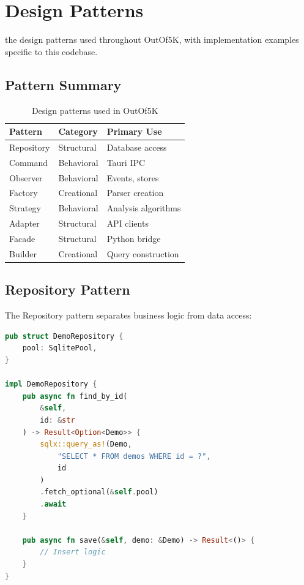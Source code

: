 \chapter{Design Patterns}
\label{ch:patterns}

 the design patterns used throughout OutOf5K, with implementation examples specific to this codebase.

\section{Pattern Summary}

\begin{table}[h]
    \centering
    \begin{tabular}{@{}lll@{}}
        \toprule
        \textbf{Pattern} & \textbf{Category} & \textbf{Primary Use} \\
        \midrule
        Repository & Structural & Database access \\
        Command & Behavioral & Tauri IPC \\
        Observer & Behavioral & Events, stores \\
        Factory & Creational & Parser creation \\
        Strategy & Behavioral & Analysis algorithms \\
        Adapter & Structural & API clients \\
        Facade & Structural & Python bridge \\
        Builder & Creational & Query construction \\
        \bottomrule
    \end{tabular}
    \caption{Design patterns used in OutOf5K}
\end{table}

\section{Repository Pattern}


The Repository pattern separates business logic from data access:

\begin{lstlisting}[language=Rust]
pub struct DemoRepository {
    pool: SqlitePool,
}

impl DemoRepository {
    pub async fn find_by_id(
        &self, 
        id: &str
    ) -> Result<Option<Demo>> {
        sqlx::query_as!(Demo, 
            "SELECT * FROM demos WHERE id = ?", 
            id
        )
        .fetch_optional(&self.pool)
        .await
    }
    
    pub async fn save(&self, demo: &Demo) -> Result<()> {
        // Insert logic
    }
}
\end{lstlisting}

